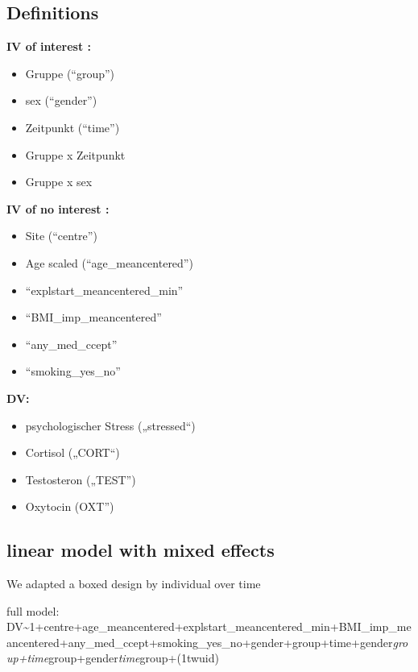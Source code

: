 \documentclass[
]{article}
\providecommand{\tightlist}{%
  \setlength{\itemsep}{0pt}\setlength{\parskip}{0pt}}
\begin{document}
\hypertarget{definitions}{%
\subsection{Definitions}\label{definitions}}

\textbf{IV of interest :}

\begin{itemize}
\tightlist
\item
  Gruppe (``group'')
\item
  sex (``gender'')
\item
  Zeitpunkt (``time'')
\item
  Gruppe x Zeitpunkt
\item
  Gruppe x sex
\end{itemize}

\textbf{IV of no interest :}

\begin{itemize}
\tightlist
\item
  Site (``centre'')
\item
  Age scaled (``age\_meancentered'')
\item
  ``explstart\_meancentered\_min''
\item
  ``BMI\_imp\_meancentered''
\item
  ``any\_med\_ccept''
\item
  ``smoking\_yes\_no''
\end{itemize}

\textbf{DV:}

\begin{itemize}
\tightlist
\item
  psychologischer Stress („stressed``)
\item
  Cortisol („CORT``)
\item
  Testosteron („TEST'')
\item
  Oxytocin (OXT'')
\end{itemize}

\hypertarget{linear-model-with-mixed-effects}{%
\subsection{linear model with mixed
effects}\label{linear-model-with-mixed-effects}}

We adapted a boxed design by individual over time

full model:
DV\textasciitilde1+centre+age\_meancentered+explstart\_meancentered\_min+BMI\_imp\_meancentered+any\_med\_ccept+smoking\_yes\_no+gender+group+time+gender\emph{group+time}group+gender\emph{time}group+(1\textbar twuid)
\end{document}
